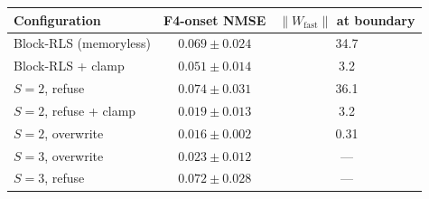 \begin{tabular}{lcc}
\toprule
Configuration & F4-onset NMSE & $\|W_{\mathrm{fast}}\|$ at boundary \\
\midrule
Block-RLS (memoryless) & $0.069\pm0.024$ & 34.7 \\
Block-RLS + clamp & $0.051\pm0.014$ & 3.2 \\
$S{=}2$, refuse & $0.074\pm0.031$ & 36.1 \\
$S{=}2$, refuse + clamp & $0.019\pm0.013$ & 3.2 \\
$S{=}2$, overwrite & $\mathbf{0.016\pm0.002}$ & 0.31 \\
$S{=}3$, overwrite & $0.023\pm0.012$ & --- \\
$S{=}3$, refuse & $0.072\pm0.028$ & --- \\
\bottomrule
\end{tabular}